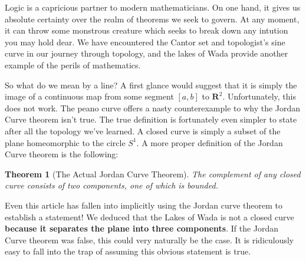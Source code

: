 \documentclass{article}
\newtheorem{theorem}{Theorem}
\begin{document}
Logic is a capricious partner to modern mathematicians. On one hand, it gives us absolute certainty over the realm of theorems we seek to govern. At any moment, it can throw some monstrous creature which seeks to break down any intution you may hold dear. We have encountered the Cantor set and topologist's sine curve in our journey through topology, and the lakes of Wada provide another example of the perils of mathematics.

So what do we mean by a line? A first glance would suggest that it is simply the image of a continuous map from some segment $[a,b]$ to $\mathbf{R}^2$. Unfortunately, this does not work. The peano curve offers a nasty counterexample to why the Jordan Curve theorem isn't true. The true definition is fortunately even simpler to state after all the topology we've learned. A closed curve is simply a subset of the plane homeomorphic to the circle $S^1$. A more proper definition of the Jordan Curve theorem is the following:
%
\begin{theorem}[The Actual Jordan Curve Theorem]
The complement of any closed curve consists of two components, one of which is bounded.
\end{theorem}
%
Even this article has fallen into implicitly using the Jordan curve theorem to establish a statement! We deduced that the Lakes of Wada is not a closed curve {\bf because it separates the plane into three components}. If the Jordan Curve theorem was false, this could very naturally be the case. It is ridiculously easy to fall into the trap of assuming this obvious statement is true.
\end{document}

